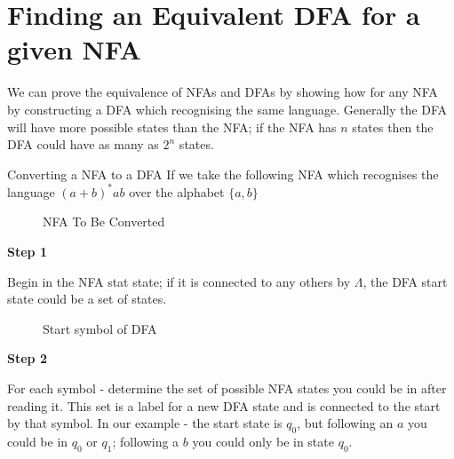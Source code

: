 \section{Finding an Equivalent DFA for a given NFA}

We can prove the equivalence of NFAs and DFAs by showing how for any NFA by constructing a DFA which recognising the same language. Generally the DFA will have more possible states than the NFA; if the NFA has $n$ states then the DFA could have as many as $2^n$ states. 

\begin{example}{Converting a NFA to a DFA}
If we take the following NFA which recognises the language $(a+b)^*ab$ over the alphabet $\{a,b\}$
\begin{figure}[H]
    \centering
    \caption{NFA To Be Converted}
    \label{fig:nfa-to-dfa-part1}
\end{figure}

\textbf{Step 1}

Begin in the NFA stat state; if it is connected to any others by $\Lambda$, the DFA start state could be a set of states.

\begin{figure}[H]
    \centering
    \caption{Start symbol of DFA}
    \label{fig:nfa-to-dfa-part2}
\end{figure}

\textbf{Step 2}

For each symbol - determine the set of possible NFA states you could be in after reading it. This set is a label for a new DFA state and is connected to the start by that symbol. In our example - the start state is $q_0$, but following an $a$ you could be in $q_0$ or $q_1$; following a $b$ you could only be in state $q_0$.


\end{example}
